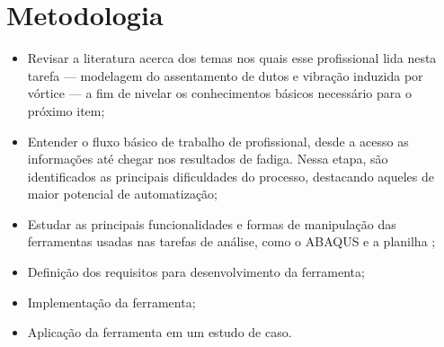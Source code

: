 \chapter{Metodologia}\label{chap:metodologia}



\begin{itemize}
    \item Revisar a literatura acerca dos temas nos quais esse profissional lida nesta tarefa --- modelagem do assentamento de dutos e vibração induzida por vórtice --- a fim de nivelar os conhecimentos básicos necessário para o próximo item; %
    \item Entender o fluxo básico de trabalho de profissional, desde a acesso as informações até chegar nos resultados de fadiga. Nessa etapa, são identificados as principais dificuldades do processo, destacando aqueles de maior potencial de automatização;
    \item Estudar as principais funcionalidades e formas de manipulação das ferramentas usadas nas tarefas de análise, como o ABAQUS e a planilha \fatfree;
    \item Definição dos requisitos para desenvolvimento da ferramenta;
    \item Implementação da ferramenta;
    \item Aplicação da ferramenta em um estudo de caso.
\end{itemize}

